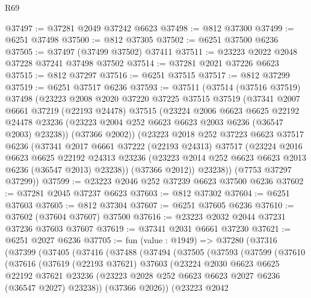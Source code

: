 \begin{lexlean}{R69}
\begin{coremodule}
{@37497 := @37281 @2049 @37242 @6623
@37498 := @812 @37300
@37499 := @6251 @37498
@37500 := @812 @37305
@37502 := @6251 @37500 @6236
@37505 := @37497 (@37499 @37502) @37411
@37511 := @23223 @2022 @2048 @37228 @37241 @37498 @37502
@37514 := @37281 @2021 @37226 @6623
@37515 := @812 @37297
@37516 := @6251 @37515
@37517 := @812 @37299
@37519 := @6251 @37517 @6236
@37593 := @37511
    (@37514
      (@37516 @37519)
      @37498
      (@23223
        @2008
        @2020
        @37220
        @37225
        @37515
        @37519
        (@37341
          @2007
          @6661
          @37219
          (@22193 @24478)
          @37515
          (@23224
            @2006
            @6623
            @6625
            @22192
            @24478
            @23236
            (@23223 @2004 @252 @6623 @6623 @2003 @6236 (@36547 @2003) @23238))
          (@37366 @2002))
        (@23223
          @2018
          @252
          @37223
          @6623
          @37517
          @6236
          (@37341
            @2017
            @6661
            @37222
            (@22193 @24313)
            @37517
            (@23224
              @2016
              @6623
              @6625
              @22192
              @24313
              @23236
              (@23223 @2014 @252 @6623 @6623 @2013 @6236 (@36547 @2013) @23238))
            (@37366 @2012))
          @23238))
      (@7753 @37297 @37299))
@37599 := @23223 @2046 @252 @37239 @6623 @37500 @6236
@37602 := @37281 @2045 @37237 @6623
@37603 := @812 @37302
@37604 := @6251 @37603
@37605 := @812 @37304
@37607 := @6251 @37605 @6236
@37610 := @37602 (@37604 @37607) @37500
@37616 := @23223 @2032 @2044 @37231 @37236 @37603 @37607
@37619 := @37341 @2031 @6661 @37230
@37621 := @6251 @2027 @6236
@37705 := fun (value : @1949) =>
  @37280
    (@37316
      (@37399
        (@37405
          (@37416
            (@37488
              (@37494
                (@37505
                  (@37593
                    (@37599
                      (@37610
                        (@37616
                          (@37619
                            (@22193 @37621)
                            @37603
                            (@23224
                              @2030
                              @6623
                              @6625
                              @22192
                              @37621
                              @23236
                              (@23223 @2028 @252 @6623 @6623 @2027 @6236 (@36547 @2027) @23238))
                            (@37366 @2026))
                          (@23223
                            @2042
}
\end{coremodule}
\end{lexlean}
